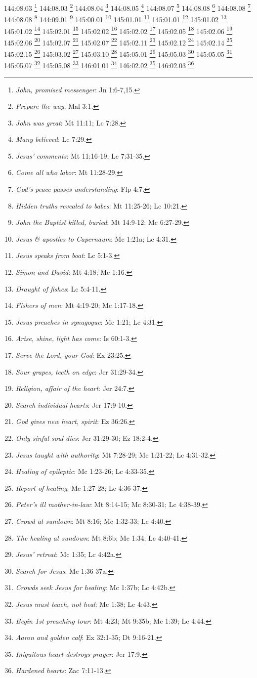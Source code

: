 {{{{{{{{{{{{{{{{{{{{{{{{{{{{144:08.03 \footnote{\textit{John, promised messenger}: Jn 1:6-7,15.}
144:08.03 \footnote{\textit{Prepare the way}: Mal 3:1.}
144:08.04 \footnote{\textit{John was great}: Mt 11:11; Lc 7:28.}
144:08.05 \footnote{\textit{Many believed}: Lc 7:29.}
144:08.07 \footnote{\textit{Jesus' comments}: Mt 11:16-19; Lc 7:31-35.}
144:08.08 \footnote{\textit{Come all who labor}: Mt 11:28-29.}
144:08.08 \footnote{\textit{God's peace passes understanding}: Flp 4:7.}
144:08.08 \footnote{\textit{Hidden truths revealed to babes}: Mt 11:25-26; Lc 10:21.}
144:09.01 \footnote{\textit{John the Baptist killed, buried}: Mt 14:9-12; Mc 6:27-29.}
145:00.01 \footnote{\textit{Jesus & apostles to Capernaum}: Mc 1:21a; Lc 4:31.}
145:01.01 \footnote{\textit{Jesus speaks from boat}: Lc 5:1-3.}
145:01.01 \footnote{\textit{Simon and David}: Mt 4:18; Mc 1:16.}
145:01.02 \footnote{\textit{Draught of fishes}: Lc 5:4-11.}
145:01.02 \footnote{\textit{Fishers of men}: Mt 4:19-20; Mc 1:17-18.}
145:02.01 \footnote{\textit{Jesus preaches in synagogue}: Mc 1:21; Lc 4:31.}
145:02.02 \footnote{\textit{Arise, shine, light has come}: Is 60:1-3.}
145:02.02 \footnote{\textit{Serve the Lord, your God}: Ex 23:25.}
145:02.05 \footnote{\textit{Sour grapes, teeth on edge}: Jer 31:29-34.}
145:02.06 \footnote{\textit{Religion, affair of the heart}: Jer 24:7.}
145:02.06 \footnote{\textit{Search individual hearts}: Jer 17:9-10.}
145:02.07 \footnote{\textit{God gives new heart, spirit}: Ez 36:26.}
145:02.07 \footnote{\textit{Only sinful soul dies}: Jer 31:29-30; Ez 18:2-4.}
145:02.11 \footnote{\textit{Jesus taught with authority}: Mt 7:28-29; Mc 1:21-22; Lc 4:31-32.}
145:02.12 \footnote{\textit{Healing of epileptic}: Mc 1:23-26; Lc 4:33-35.}
145:02.14 \footnote{\textit{Report of healing}: Mc 1:27-28; Lc 4:36-37.}
145:02.15 \footnote{\textit{Peter's ill mother-in-law}: Mt 8:14-15; Mc 8:30-31; Lc 4:38-39.}
145:03.02 \footnote{\textit{Crowd at sundown}: Mt 8:16; Mc 1:32-33; Lc 4:40.}
145:03.10 \footnote{\textit{The healing at sundown}: Mt 8:6b; Mc 1:34; Lc 4:40-41.}
145:05.01 \footnote{\textit{Jesus' retreat}: Mc 1:35; Lc 4:42a.}
145:05.03 \footnote{\textit{Search for Jesus}: Mc 1:36-37a.}
145:05.05 \footnote{\textit{Crowds seek Jesus for healing}: Mc 1:37b; Lc 4:42b.}
145:05.07 \footnote{\textit{Jesus must teach, not heal}: Mc 1:38; Lc 4:43.}
145:05.08 \footnote{\textit{Begin 1st preaching tour}: Mt 4:23; Mt 9:35b; Mc 1:39; Lc 4:44.}
146:01.01 \footnote{\textit{Aaron and golden calf}: Ex 32:1-35; Dt 9:16-21.}
146:02.02 \footnote{\textit{Iniquitous heart destroys prayer}: Jer 17:9.}
146:02.03 \footnote{\textit{Hardened hearts}: Zac 7:11-13.}
}}}}}}}}}}}}}}}}}}}}}}}}}}}}
